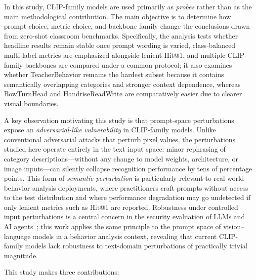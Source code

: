 \documentclass[symmetry,article,submit,pdftex,moreauthors]{Definitions/mdpi}
\begin{document}
In this study, CLIP-family models are used primarily as \emph{probes} rather than as the main methodological contribution. The main objective is to determine how prompt choice, metric choice, and backbone family change the conclusions drawn from zero-shot classroom benchmarks. Specifically, the analysis tests whether headline results remain stable once prompt wording is varied, class-balanced multi-label metrics are emphasized alongside lenient Hit@1, and multiple CLIP-family backbones are compared under a common protocol; it also examines whether TeacherBehavior remains the hardest subset because it contains semantically overlapping categories and stronger context dependence, whereas BowTurnHead and HandriseReadWrite are comparatively easier due to clearer visual boundaries.

A key observation motivating this study is that prompt-space perturbations expose an \emph{adversarial-like vulnerability} in CLIP-family models. Unlike conventional adversarial attacks that perturb pixel values, the perturbations studied here operate entirely in the text input space: minor rephrasing of category descriptions---without any change to model weights, architecture, or image inputs---can silently collapse recognition performance by tens of percentage points. This form of \emph{semantic perturbation} is particularly relevant to real-world behavior analysis deployments, where practitioners craft prompts without access to the test distribution and where performance degradation may go undetected if only lenient metrics such as Hit@1 are reported. Robustness under controlled input perturbations is a central concern in the security evaluation of LLMs and AI agents~\cite{zhou2025security_llm,deng2025ai_agents}; this work applies the same principle to the prompt space of vision--language models in a behavior analysis context, revealing that current CLIP-family models lack robustness to text-domain perturbations of practically trivial magnitude.


This study makes three contributions:
\end{document}

